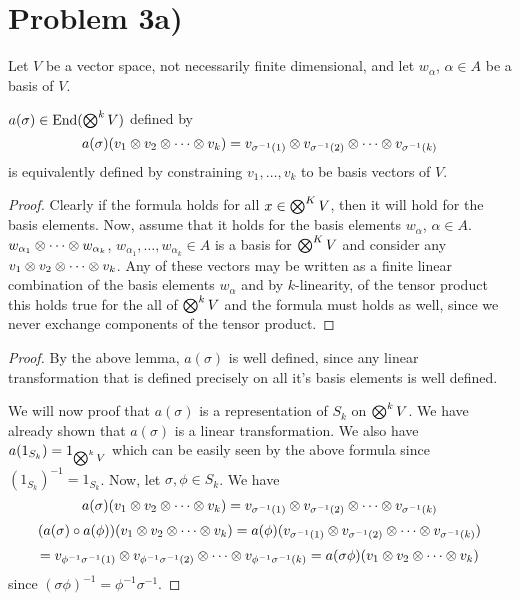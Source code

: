 \section*{Problem 3a)}
Let $V$ be a vector space, not necessarily finite dimensional, and let $w_\alpha$, $\alpha\in A$ be a basis of $V$.
\begin{lemma}
$a(\sigma)\in \text{End}(\bigotimes^k V)$ defined by 
\[ a(\sigma)(v_1\otimes v_2 \otimes \cdots \otimes v_k) = v_{\sigma^{-1}(1)} \otimes v_{\sigma^{-1}(2)} \otimes  \cdots \otimes v_{\sigma^{-1}(k)} \] is equivalently defined by constraining $v_1,\ldots,v_k$ to be basis vectors of $V$.
\begin{proof}
Clearly if the formula holds for all $x\in \bigotimes^K V$, then it will hold for the basis elements. Now, assume that it holds for the basis elements $w_\alpha$, $\alpha\in A$.  $w_{\alpha_1}\otimes \cdots \otimes w_{\alpha_k}$, $w_{\alpha_1},\ldots,w_{\alpha_k}\in A$ is a basis for $\bigotimes^K V$ and consider any $v_1\otimes v_2 \otimes \cdots \otimes v_k$. Any of these vectors may be written as a finite linear combination of the basis elements $w_\alpha$ and by $k$-linearity, of the tensor product this holds true for the all of $\bigotimes^k V$ and the formula must holds as well, since we never exchange components of the tensor product.
\end{proof}
\end{lemma}
\begin{proof}
By the above lemma, $a(\sigma)$ is well defined, since any linear transformation that is defined precisely on all it's basis elements is well defined. \par 
We will now proof that $a(\sigma)$ is a representation of $S_k$ on $\bigotimes^k V$. We have already shown that $a(\sigma)$ is a linear transformation. We also have $a(1_{S_k}) = 1_{\bigotimes^k V}$ which can be easily seen by the above formula since $(1_{S_k})^{-1}=1_{S_k}$. Now, let $\sigma,\phi \in S_k$. We have
\[ a(\sigma)(v_1\otimes v_2 \otimes \cdots \otimes v_k) = v_{\sigma^{-1}(1)} \otimes v_{\sigma^{-1}(2)} \otimes  \cdots \otimes v_{\sigma^{-1}(k)} \]
\[(a(\sigma)\circ a(\phi))(v_1\otimes v_2 \otimes \cdots \otimes v_k) = a(\phi)(v_{\sigma^{-1}(1)} \otimes v_{\sigma^{-1}(2)} \otimes  \cdots \otimes v_{\sigma^{-1}(k)}) \]\[= v_{\phi^{-1}\sigma^{-1}(1)} \otimes v_{\phi^{-1}\sigma^{-1}(2)} \otimes  \cdots \otimes v_{\phi^{-1}\sigma^{-1}(k)} = a(\sigma\phi)(v_1\otimes v_2 \otimes \cdots \otimes v_k) \] 
since $(\sigma\phi)^{-1}=\phi^{-1}\sigma^{-1}$.
\end{proof}
